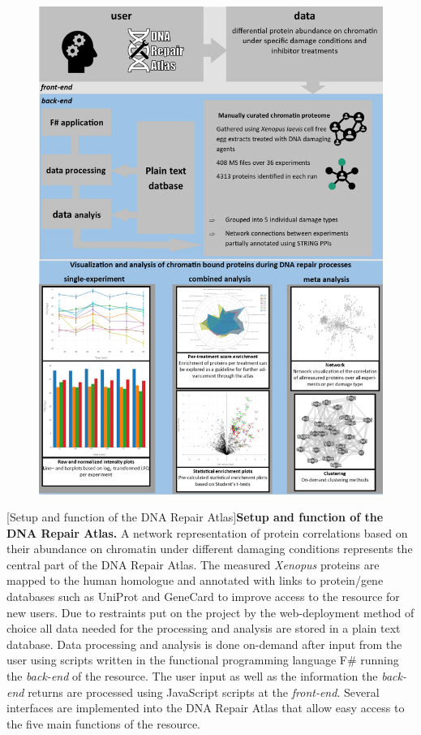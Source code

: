 \begin{figure}[H]
    \centering
    \includegraphics[width=\textwidth]{resources/images/Results/FlowChart.png}
\end{figure}
\newpage
\begin{center}
    [Setup and function of the DNA Repair Atlas]{\textbf{Setup and function of the DNA Repair Atlas.} A network representation of protein correlations based on their abundance on chromatin under different damaging conditions represents the central part of the DNA Repair Atlas. The measured \textit{Xenopus} proteins are mapped to the human homologue and annotated with links to protein/gene databases such as UniProt and GeneCard to improve access to the resource for new users. Due to restraints put on the project by the web-deployment method of choice all data needed for the processing and analysis are stored in a plain text database. Data processing and analysis is done on-demand after input from the user using scripts written in the functional programming language F\# running the \textit{back-end} of the resource. The user input as well as the information the \textit{back-end} returns are processed using JavaScript scripts at the \textit{front-end}. Several interfaces are implemented into the DNA Repair Atlas that allow easy access to the five main functions of the resource.}
    \label{fig:flowchart}
\end{center}
